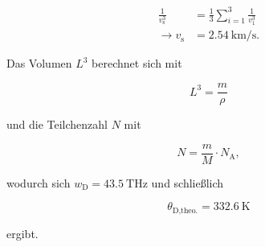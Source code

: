\begin{align*}
    \frac{1}{v_\text{s}^3} &= \frac{1}{3} \sum_{i=1}^3 \frac{1}{v_1^3}\\
    \rightarrow v_\text{s} &= \SI{2.54}{\kilo\meter\per\second}. 
\end{align*}

Das Volumen $L^3$ berechnet sich mit 

\begin{equation*}
    L^3 = \frac{m}{\rho}
\end{equation*}

und die Teilchenzahl $N$ mit 

\begin{equation*}
    N = \frac{m}{M}\cdot N_\text{A},
\end{equation*}

wodurch sich $w_\text{D} = \SI{43.5}{\tera\hertz}$ und schließlich 

\begin{equation*}
    \theta_\text{D,theo.} = \SI{332.6}{\kelvin}
\end{equation*}

ergibt.